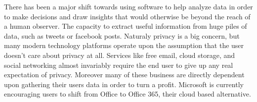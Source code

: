 There has been a major shift towards using software to help analyze data in order to make decisions and draw insights that would otherwise be beyond the reach of a human observer.\autocite[]{NextGenBusinessSoftware}
The capacity to extract useful information from huge piles of data, such as tweets or facebook posts.\autocite[]{NextGenBusinessSoftware}
Naturaly privacy is a big concern, but many modern technology platforms operate upon the assumption that the user doesn't care about privacy at all. Services like free email, cloud storage, and social networking almost invariably require the end user to give up any real expectation of privacy. Moreover many of these business are directly dependent upon gathering their users data in order to turn a profit.\autocite[]{NextGenBusinessSoftware}
Microsoft is currently encouraging users to shift from Office  to Office 365, their cloud based alternative.\autocite[]{NextGenBusinessSoftware}
